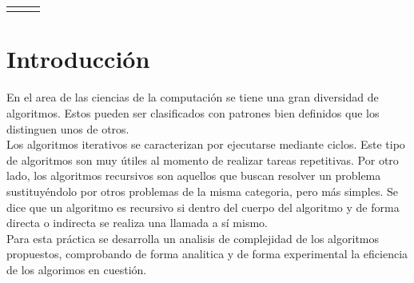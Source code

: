 \documentclass{report}
\begin{document}
\begin{center}
\begin{tabular}{l c r}
    & \bf\fontsize{22}{0}{\selectfont{ Escuela Superior de C\'omputo}} &  \\
    \end{tabular}

    
    \vspace*{2\baselineskip}
    
    {
        \bf\fontsize{12}{0}{\selectfont{An\'alisis de Algoritmos, Sem: 2021-1, 3CV1, Pr\'actica 2, 26/10/20}}
    }
            
    \vspace*{2\baselineskip}
             
    {
        \fontsize{23}{0}{\selectfont{Práctica 2: Funciones Recursivas vs Iterativas}}
    }
    
    \vspace*{2\baselineskip}
    
    {
        \bf\fontsize{12}{0}{\selectfont{Valle Mart\'inez Luis Eduardo, Rivero Ronquillo Omar Imanol}}
    }
    
    \vspace*{1\baselineskip}
    
    {
    }
    
    \vspace*{2\baselineskip}

    {
        \fontsize{12}{0}
        
        \fontsize{12}{0}
    
    }
\end{center}

\hfill \break
\hfill \break
\hfill \break

\section*{Introducción} 
    En el area de las ciencias de la computaci\'on se tiene una gran diversidad de algoritmos. Estos pueden ser clasificados con patrones bien definidos que los distinguen unos de otros.\\
    Los algoritmos iterativos se caracterizan por ejecutarse mediante ciclos. Este tipo de algoritmos son muy \'utiles al momento de realizar tareas repetitivas. Por otro lado, los algoritmos recursivos son aquellos que buscan resolver un problema sustituy\'endolo por otros problemas de la misma categoria, pero m\'as simples. Se dice que un algoritmo es recursivo si dentro del cuerpo del algoritmo y de forma directa o indirecta se realiza una llamada a s\'i mismo.\\
    Para esta pr\'actica se desarrolla un analisis de complejidad de los algoritmos propuestos, comprobando de forma analitica y de forma experimental la eficiencia de los algorimos en cuesti\'on.
\end{document}
